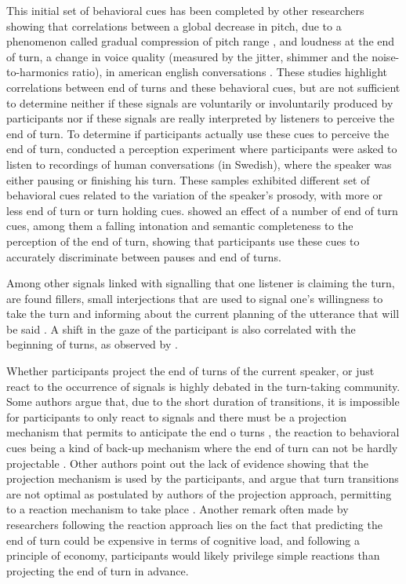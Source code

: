 This initial set of behavioral cues has been completed by other researchers showing that correlations between a global decrease in pitch, due to a phenomenon called gradual compression of pitch range \citep{pierrehumbert_meaning_1990}, and loudness at the end of turn, a change in voice quality (measured by the jitter, shimmer and the noise-to-harmonics ratio), in american english conversations \citep{gravano_turn-taking_2011}. These studies highlight correlations between end of turns and these behavioral cues, but are not sufficient to determine neither if these signals are voluntarily or involuntarily produced by participants nor if these signals are really interpreted by listeners to perceive the end of turn. 
To determine if participants actually use these cues to perceive the end of turn, \citep{hjalmarsson_additive_2011} conducted a perception experiment where participants were asked to listen to recordings of human conversations (in Swedish), where the speaker was either pausing or finishing his turn. These samples exhibited different set of behavioral cues related to the variation of the speaker's prosody, with more or less end of turn or turn holding cues. \citep{hjalmarsson_additive_2011} showed an effect of a number of end of turn cues, among them a falling intonation and semantic completeness to the perception of the end of turn, showing that participants use these cues to accurately discriminate between pauses and end of turns. 
	
Among other signals linked with signalling that one listener is claiming the turn, are found fillers, small interjections that are used to signal one's willingness to take the turn and informing about the current planning of the utterance that will be said \citep{benus_pragmatic_2011}. A shift in the gaze of the participant is also correlated with the beginning of turns, as observed by \citep{kendon_functions_1967,novick_coordinating_1996}. 

Whether participants project the end of turns of the current speaker, or just react to the occurrence of signals is highly debated in the turn-taking community. Some authors argue that, due to the short duration of transitions, it is impossible for participants to only react to signals and there must be a projection mechanism that permits to anticipate the end o turns \citep{magyari_prediction_2012,riest_anticipation_2015}, the reaction to behavioral cues being a kind of back-up mechanism where the end of turn can not be hardly projectable \citep{grosjean_using_1996}. Other authors point out the lack of evidence showing that the projection mechanism is used by the participants, and argue that turn transitions are not optimal as postulated by authors of the projection approach, permitting to a reaction mechanism to take place \citep{heldner_pauses_2010}. Another remark often made by researchers following the reaction approach lies on the fact that predicting the end of turn could be expensive in terms of cognitive load, and following a principle of economy, participants would likely privilege simple reactions than projecting the end of turn in advance. 

